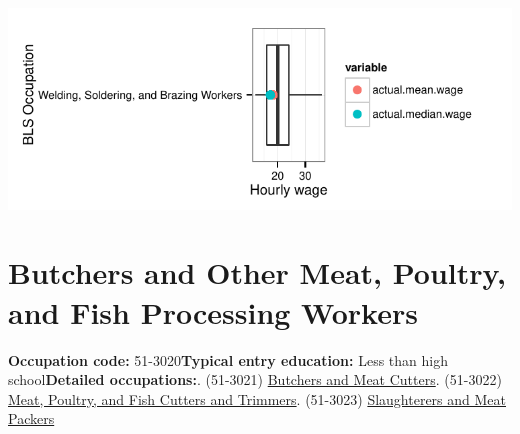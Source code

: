 \documentclass[a4paper,10pt]{article}\usepackage[]{graphicx}\usepackage[]{color}
\makeatletter
\def\maxwidth{ %
  \ifdim\Gin@nat@width>\linewidth
    \linewidth
  \else
    \Gin@nat@width
  \fi
}
\makeatother
\begin{document}
{\centering \includegraphics[width=\maxwidth]{figure/unnamed-chunk-289} 

}


\newpage\section{Butchers and Other Meat, Poultry, and Fish Processing Workers}\textbf{Occupation code:} 51-3020\newline\textbf{Typical entry education:} Less than high school\newline\textbf{Detailed occupations:}. (51-3021)  \href{http://www.bls.gov/oes/current/oes513021.htm}{Butchers and Meat Cutters}. (51-3022)  \href{http://www.bls.gov/oes/current/oes513022.htm}{Meat, Poultry, and Fish Cutters and Trimmers}. (51-3023)  \href{http://www.bls.gov/oes/current/oes513023.htm}{Slaughterers and Meat Packers}\newline%
\end{document}

